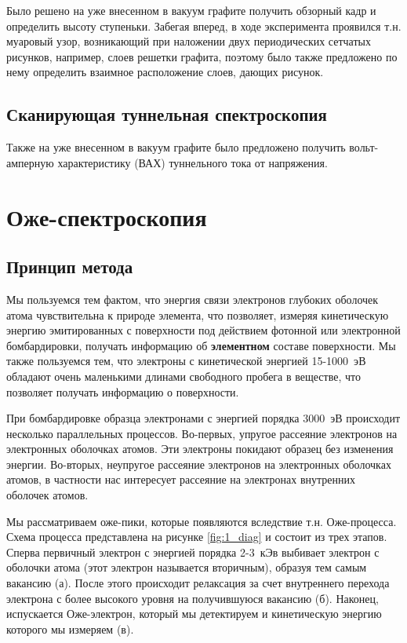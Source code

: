 \documentclass[a4paper, 12pt]{article}
\begin{document}
	Было решено на уже внесенном в вакуум графите получить обзорный кадр и определить высоту ступеньки. Забегая вперед, в ходе эксперимента проявился т.н. муаровый узор, возникающий при наложении двух периодических сетчатых рисунков, например, слоев решетки графита, поэтому было также предложено по нему определить взаимное расположение слоев, дающих рисунок.
	
	\subsection{Сканирующая туннельная спектроскопия}
	
	Также на уже внесенном в вакуум графите было предложено получить вольт-амперную характеристику (ВАХ) туннельного тока от напряжения.
	
	\section{Оже-спектроскопия}
	
	\subsection{Принцип метода}
	
	Мы пользуемся тем фактом, что энергия связи электронов глубоких оболочек атома чувствительна к природе элемента, что позволяет, измеряя кинетическую энергию эмитированных с поверхности под действием фотонной или электронной бомбардировки, получать информацию об \textbf{элементном} составе поверхности. Мы также пользуемся тем, что электроны с кинетической энергией 15-1000~эВ обладают очень маленькими длинами свободного пробега в веществе, что позволяет получать информацию о поверхности.
	
	При бомбардировке образца электронами с энергией порядка 3000~эВ происходит несколько параллельных процессов. Во-первых, упругое рассеяние электронов на электронных оболочках атомов. Эти электроны покидают образец без изменения энергии. Во-вторых, неупругое рассеяние электронов на электронных оболочках атомов, в частности нас интересует рассеяние на электронах внутренних оболочек атомов.
	
	Мы рассматриваем оже-пики, которые появляются вследствие т.н. Оже-процесса. Схема процесса представлена на рисунке \ref{fig:1_diag} и состоит из трех этапов. Сперва первичный электрон с энергией порядка 2-3~кЭв выбивает электрон с оболочки атома (этот электрон называется вторичным), образуя тем самым вакансию (а). После этого происходит релаксация за счет внутреннего перехода электрона с более высокого уровня на получившуюся вакансию (б). Наконец, испускается Оже-электрон, который мы детектируем и кинетическую энергию которого мы измеряем (в).
	
\end{document}
